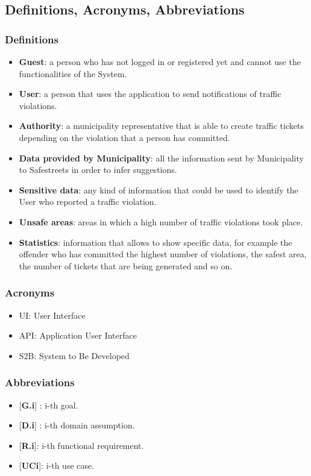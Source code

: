 \subsection{Definitions, Acronyms, Abbreviations}
    \subsubsection{Definitions}
        \begin{itemize}
            \item \textbf{Guest}: a person who has not logged in or registered yet and cannot use the functionalities of the System.
            \item \textbf{User}: a person that uses the application to send notifications of traffic violations.
            \item \textbf{Authority}: a municipality representative that is able to create traffic tickets depending on the violation that a person has committed.
            \item \textbf{Data provided by Municipality}: all the information sent by Municipality to Safestreets in order to infer suggestions.
            \item \textbf{Sensitive data}: any kind of information that could be used to identify the User who reported a traffic violation.
            \item \textbf{Unsafe areas}: areas in which a high number of traffic violations took place.
            \item \textbf{Statistics}: information that allows to show specific data, for example the offender who has committed the highest number of violations, the safest area, the number of tickets that are being generated and so on.
        \end{itemize}
        
    \subsubsection{Acronyms}
    \begin{itemize}
        \item UI: User Interface
        \item API: Application User Interface
        \item S2B: System to Be Developed
    \end{itemize}
    \subsubsection{Abbreviations}
        \begin{itemize}
            \item {[\textbf{G.i}]} : i-th goal.
            \item {[\textbf{D.i}]} : i-th domain assumption.
            \item {[\textbf{R.i}]}: i-th functional requirement.
            \item {[\textbf{UCi}]}: i-th use case.
        \end{itemize}

